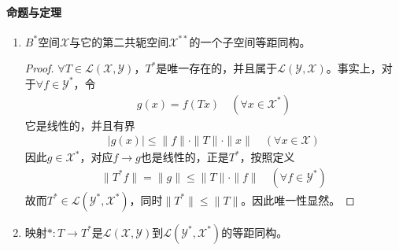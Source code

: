 	\paragraph{命题与定理}
	\begin{enumerate}[leftmargin=2cm, label=\arabic*]
		\item $B^*$空间$\mathscr{X}$与它的第二共轭空间$\mathscr{X}^{**}$的一个子空间等距同构。
		\begin{proof}
			$\forall T\in\mathscr{L}(\mathscr{X},\mathscr{Y})$，$T^*$是唯一存在的，并且属于$\mathscr{L}(\mathscr{Y},\mathscr{X})$。事实上，对于$\forall f\in\mathscr{Y}^*$，令
			\begin{align*}
				g(x) = f(Tx)\quad (\forall x\in\mathscr{X}^*)
			\end{align*}
			它是线性的，并且有界
			\begin{align*}
				|g(x)| \leqslant \|f\|\cdot\|T\|\cdot\|x\| \quad (\forall x\in\mathscr{X})
			\end{align*}
			因此$g\in\mathscr{X}^*$，对应$f\to g$也是线性的，正是$T^*$，按照定义
			\begin{align*}
				\|T^*f\| = \|g\| \leqslant \|T\|\cdot \|f\| \quad (\forall f\in\mathscr{Y}^*)
			\end{align*}
			故而$T^*\in\mathscr{L}(\mathscr{Y}^*,\mathscr{X}^*)$，同时$\|T^*\|\leqslant \|T\|$。因此唯一性显然。        
		\end{proof}
		
		\item 映射$*:T\to T^*$是$\mathscr{L}(\mathscr{X},\mathscr{Y})$到$\mathscr{L}(\mathscr{Y}^*,\mathscr{X}^*)$的等距同构。
	\end{enumerate}
	
